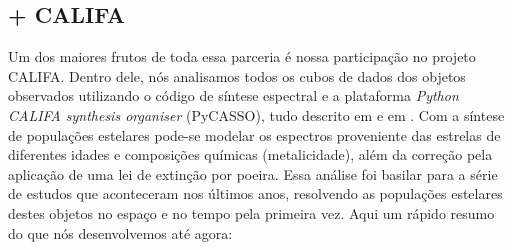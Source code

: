 \subsection{\starlight + CALIFA}
\label{sec:intro:UFSCeIAA:SLCAL}
Um dos maiores frutos de toda essa parceria é nossa participação no projeto CALIFA. Dentro dele, nós analisamos todos os cubos de dados dos objetos observados utilizando o código de síntese espectral \starlight e a plataforma {\em Python CALIFA \starlight synthesis organiser} (PyCASSO), tudo descrito em \citet{CidFernandes.etal.2013a, CidFernandes.etal.2014a} e em \citet{deAmorim.etal.2017}. Com a síntese de populações estelares pode-se modelar os espectros proveniente das estrelas de diferentes idades e composições químicas (metalicidade), além da correção pela aplicação de uma lei de extinção por poeira. Essa análise foi basilar para a série de estudos que aconteceram nos últimos anos, resolvendo as populações estelares destes objetos no espaço e no tempo pela primeira vez. Aqui um rápido resumo do que nós desenvolvemos até agora:

